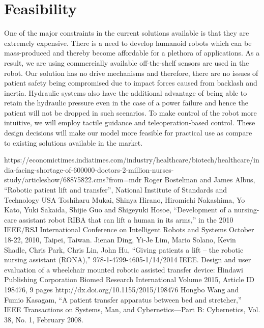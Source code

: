 \documentclass[12]{article}
\begin{document}
\section{Feasibility}
One of the major constraints in the current solutions available is that they are extremely expensive. There is a need to develop humanoid robots which can be mass-produced and thereby become affordable for a plethora of applications. As a result, we are using commercially available off-the-shelf sensors are used in the robot. Our solution has no drive mechanisms and therefore, there are no issues of patient safety being compromised due to impact forces caused from backlash and inertia. Hydraulic systems also have the additional advantage of being able to retain the hydraulic pressure even in the case of a power failure and hence the patient will not be dropped in such scenarios. To make control of the robot more intuitive, we will employ tactile guidance and teleoperation-based control. These design decisions will make our model more feasible for practical use as compare to existing solutions available in the market. 
\begin{thebibliography}{9}
	 https://economictimes.indiatimes.com/industry/healthcare/biotech/healthcare/india-facing-shortage-of-600000-doctors-2-million-nurses-study/articleshow/68875822.cms?from=mdr
	Roger Bostelman and James Albus, “Robotic patient lift and transfer”, National Institute of Standards and Technology USA
	Toshiharu Mukai, Shinya Hirano, Hiromichi Nakashima, Yo Kato, Yuki Sakaida, Shijie Guo and Shigeyuki Hosoe, “Development of a nursing-care assistant robot RIBA that can lift a human in its arms,” in the 2010 IEEE/RSJ International Conference on Intelligent Robots and Systems October 18-22, 2010, Taipei, Taiwan.
	Jienan Ding, Yi-Je Lim, Mario Solano, Kevin Shadle, Chris Park, Chris Lin, John Hu, “Giving patients a lift – the robotic nursing assistant (RONA),” 978-1-4799-4605-1/14/2014 IEEE.
	Design and user evaluation of a wheelchair mounted robotic assisted transfer device: Hindawi Publishing Corporation Biomed Research International Volume 2015, Article ID 198476, 9 pages http://dx.doi.org/10.1155/2015/198476
	Hongbo Wang and Fumio Kasagam, “A patient transfer apparatus between bed and stretcher,” IEEE Transactions on Systems, Man, and Cybernetics—Part B: Cybernetics, Vol. 38, No. 1, February 2008.
\end{thebibliography}
\end{document}
